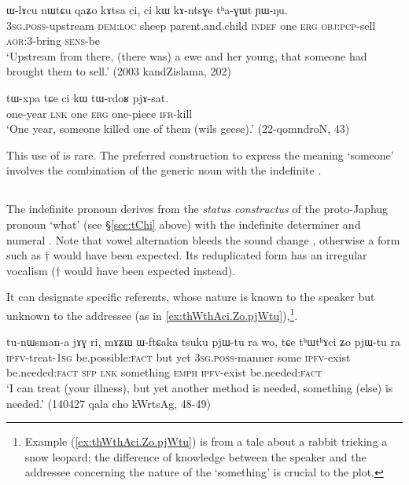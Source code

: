 \begin{exe}
\ex \label{ci.kW.thaGWt}
\gll ɯ-lɤcu nɯtɕu qaʑo kɤtsa ci, ci kɯ kɤ-ntsɣe tʰa-ɣɯt ɲɯ-ŋu. \\
\textsc{3sg}.\textsc{poss}-upstream \textsc{dem}:\textsc{loc} sheep parent.and.child \textsc{indef} one \textsc{erg} \textsc{obj}:\textsc{pcp}-sell \textsc{aor}:3\flobv{}-bring \textsc{sens}-be \\
\glt `Upstream from there, (there was) a ewe and her young, that someone had brought them to sell.' (2003 kandZislama, 202)
\end{exe}

\begin{exe}
\ex \label{ci.kW.tWrdoR}
\gll  tɯ-xpa tɕe ci kɯ tɯ-rdoʁ pjɤ-sat. \\
 one-year \textsc{lnk} one \textsc{erg} one-piece \textsc{ifr}-kill \\
 \glt `One year, someone killed one of them (wils geese).' (22-qomndroN, 43)
\end{exe}

This use of  is rare. The preferred construction to express the meaning `someone' involves the combination of the generic noun  with the indefinite .

\subsection{ } \label{sec:thWci} 
The indefinite pronoun  derives from the \textit{status constructus} of the proto-Japhug pronoun  `what' (see §\ref{sec:tChi} above) with the indefinite determiner and numeral . Note that vowel alternation bleeds the sound change  \fl{}  , otherwise a form such as $\dagger$ would have been expected. Its reduplicated form  has an irregular vocalism  ($\dagger$ would have been expected instead).

 It can designate specific referents, whose nature is known to the speaker but unknown to the addressee (as in \ref{ex:thWthAci.Zo.pjWtu}),\footnote{Example (\ref{ex:thWthAci.Zo.pjWtu}) is from a tale about a rabbit tricking a snow leopard; the difference of knowledge between the speaker and the addressee concerning the nature of the `something' is crucial to the plot. }.

\begin{exe}
\ex  \label{ex:thWthAci.Zo.pjWtu}
\gll tu-nɯsman-a jɤɣ ri, mɤʑɯ ɯ-ftɕaka tsuku pjɯ-tu ra wo, tɕe tʰɯtʰɤci ʑo pjɯ-tu ra \\
\textsc{ipfv}-treat-\textsc{1sg} be.possible:\textsc{fact} but yet \textsc{3sg}.\textsc{poss}-manner some \textsc{ipfv}-exist be.needed:\textsc{fact} \textsc{sfp} \textsc{lnk} something \textsc{emph} \textsc{ipfv}-exist be.needed:\textsc{fact} \\
\glt `I can treat (your illness), but yet another method is needed, something (else) is needed.'  (140427 qala cho kWrtsAg, 48-49)
\end{exe}

